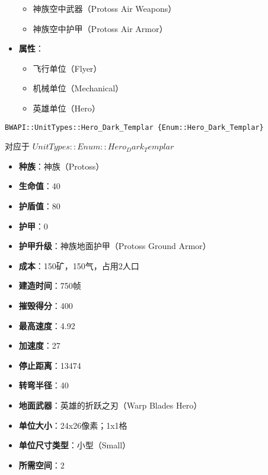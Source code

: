 \begin{tcolorbox}[colback=white, colframe=black!60!white, title=Hero\_Danimoth(), arc=0mm]
\begin{itemize}
\begin{itemize}
                \item 神族空中武器（Protoss Air Weapons）
                \item 神族空中护甲（Protoss Air Armor）
            \end{itemize}
        \item \textbf{属性}：
            \begin{itemize}
                \item 飞行单位（Flyer）
                \item 机械单位（Mechanical）
                \item 英雄单位（Hero）
            \end{itemize}
    \end{itemize}
\end{tcolorbox}

\begin{tcolorbox}[colback=white, colframe=black!60!white, title=Hero\_Dark\_Templar(), arc=0mm]
    \begin{verbatim}
BWAPI::UnitTypes::Hero_Dark_Templar {Enum::Hero_Dark_Templar}
    \end{verbatim}
    对应于  $ UnitTypes::Enum::Hero_Dark_Templar $ 
    \begin{itemize}
        \item \textbf{种族}：神族（Protoss）
        \item \textbf{生命值}：40
        \item \textbf{护盾值}：80
        \item \textbf{护甲}：0
        \item \textbf{护甲升级}：神族地面护甲（Protoss Ground Armor）
        \item \textbf{成本}：150矿，150气，占用2人口
        \item \textbf{建造时间}：750帧
        \item \textbf{摧毁得分}：400
        \item \textbf{最高速度}：4.92
        \item \textbf{加速度}：27
        \item \textbf{停止距离}：13474
        \item \textbf{转弯半径}：40
        \item \textbf{地面武器}：英雄的折跃之刃（Warp Blades Hero）
        \item \textbf{单位大小}：24x26像素；1x1格
        \item \textbf{单位尺寸类型}：小型（Small）
        \item \textbf{所需空间}：2

\end{itemize}
\end{tcolorbox}
